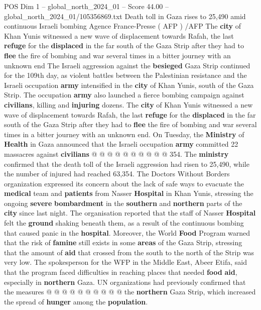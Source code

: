 \begin{textsample}{POS Dim 1 – global\_north\_2024\_01 – Score 44.00 – global\_north\_2024\_01/105356869.txt}  \label{ex:f1_pos_154}
Death toll in Gaza rises to 25,490 amid continuous Israeli bombing Agence France-Presse ( AFP ) /AFP The \textbf{city} of Khan Yunis witnessed a new wave of displacement towards Rafah, the last \textbf{refuge} for the \textbf{displaced} in the far south of the Gaza Strip after they had to \textbf{flee} the fire of bombing and war several times in a bitter journey with an unknown end The Israeli aggression against the \textbf{besieged} Gaza Strip continued for the 109th day, as violent battles between the Palestinian resistance and the Israeli occupation \textbf{army} intensified in the \textbf{city} of Khan Yunis, south of the Gaza Strip.
The occupation \textbf{army} also launched a fierce bombing campaign against \textbf{civilians}, killing and \textbf{injuring} dozens.
The \textbf{city} of Khan Yunis witnessed a new wave of displacement towards Rafah, the last \textbf{refuge} for the \textbf{displaced} in the far south of the Gaza Strip after they had to \textbf{flee} the fire of bombing and war several times in a bitter journey with an unknown end.
On Tuesday, the \textbf{Ministry} of \textbf{Health} in Gaza announced that the Israeli occupation \textbf{army} committed 22 massacres against \textbf{civilians} @ @ @ @ @ @ @ @ @ @ 354.
The \textbf{ministry} confirmed that the death toll of the Israeli aggression had risen to 25,490, while the number of injured had reached 63,354.
The Doctors Without Borders organization expressed its concern about the lack of safe ways to evacuate the \textbf{medical} team and \textbf{patients} from Nasser \textbf{Hospital} in Khan Yunis, stressing the ongoing \textbf{severe} \textbf{bombardment} in the \textbf{southern} and \textbf{northern} parts of the \textbf{city} since last night.
The organisation reported that the staff of Nasser \textbf{Hospital} felt the \textbf{ground} shaking beneath them, as a result of the continuous bombing that caused panic in the \textbf{hospital}.
Moreover, the World \textbf{Food} Program warned that the risk of \textbf{famine} still exists in some \textbf{areas} of the Gaza Strip, stressing that the amount of \textbf{aid} that crossed from the south to the north of the Strip was very low.
The spokesperson for the WFP in the Middle East, Abeer Etifa, said that the program faced difficulties in reaching places that needed \textbf{food} \textbf{aid}, especially in \textbf{northern} Gaza.
UN organizations had previously confirmed that the measures @ @ @ @ @ @ @ @ @ @ the \textbf{northern} Gaza Strip, which increased the spread of \textbf{hunger} among the \textbf{population}.

\end{textsample}
